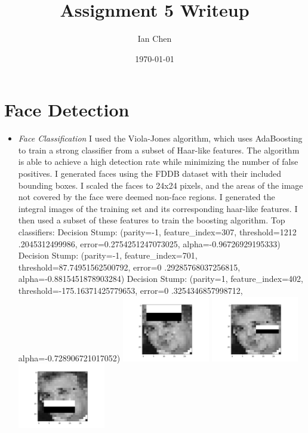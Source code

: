 \documentclass[11pt]{article}
\title{Assignment 5 Writeup}
\author{Ian Chen}
\date{\today}
\begin{document}
    \maketitle


    \section{Face Detection}

    \begin{itemize}
        \item \textit{Face Classification}\newline
        I used the Viola-Jones algorithm, which uses AdaBoosting to train a strong classifier from a
        subset of Haar-like features. The algorithm is able to achieve a high detection rate while
        minimizing the number of false positives. I generated faces using the FDDB dataset with
        their included bounding boxes.\newline
        I scaled the faces to 24x24 pixels, and the areas of the image not covered by the face were
        deemed non-face regions. I generated the integral images of the training set and its
        corresponding haar-like features. I then used a subset of these features to train the
        boosting algorithm.\newline
        Top classifiers: Decision Stump: (parity=-1, feature\_index=307, threshold=1212
        .2045312499986, error=0.2754251247073025, alpha=-0.96726929195333)\newline
        Decision Stump: (parity=-1, feature\_index=701, threshold=87.74951562500792, error=0
        .29285768037256815, alpha=-0.8815451878903284)\newline
        Decision Stump: (parity=1, feature\_index=402, threshold=-175.16371425779653, error=0
        .3254346857998712, alpha=-0.728906721017052)\newline
        \includegraphics[width=0.3\textwidth]{Output Pictures/rec_1}
        \includegraphics[width=0.3\textwidth]{Output Pictures/rec_2}
        \includegraphics[width=0.3\textwidth]{Output Pictures/rec_3}


\end{itemize}
\end{document}
